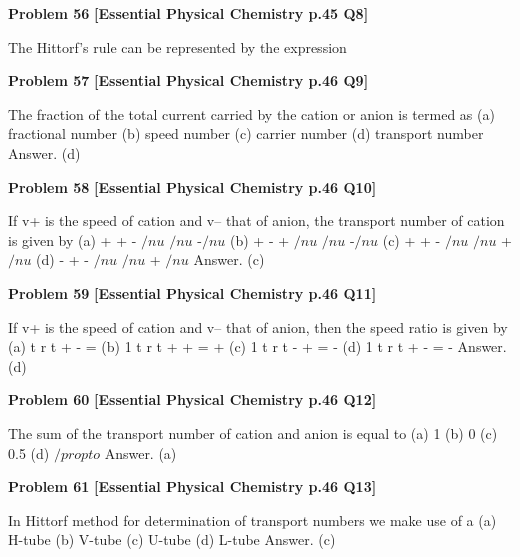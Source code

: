 \begin{problembox}
\textbf{Problem 56} \hfill \textbf{[Essential Physical Chemistry p.45 Q8]}
\label{q:ext-essential_all_questions-56}

The Hittorf's rule can be represented by the expression
\end{problembox}

\begin{problembox}
\textbf{Problem 57} \hfill \textbf{[Essential Physical Chemistry p.46 Q9]}
\label{q:ext-essential_all_questions-57}

The fraction of the total current carried by the cation or anion is termed as
(a)
fractional number
(b)
speed number
(c)
carrier number
(d)
transport number
Answer. (d)
\end{problembox}

\begin{problembox}
\textbf{Problem 58} \hfill \textbf{[Essential Physical Chemistry p.46 Q10]}
\label{q:ext-essential_all_questions-58}

If v+ is the speed of cation and v-- that of anion, the transport number of cation is given by
(a)
+
+
-
$/nu$
$/nu$ -$/nu$
(b)
+
-
+
$/nu$
$/nu$ -$/nu$
(c)
+
+
-
$/nu$
$/nu$ + $/nu$
(d)
-
+
-
$/nu$
$/nu$ + $/nu$
Answer. (c)
\end{problembox}

\begin{problembox}
\textbf{Problem 59} \hfill \textbf{[Essential Physical Chemistry p.46 Q11]}
\label{q:ext-essential_all_questions-59}

If v+ is the speed of cation and v-- that of anion, then the speed ratio is given by
(a)
t
r
t
+
-
=
(b)
1
t
r
t
+
+
=
+
(c)
1
t
r
t
-
+
=
-
(d)
1
t
r
t
+
-
=
-
Answer. (d)
\end{problembox}

\begin{problembox}
\textbf{Problem 60} \hfill \textbf{[Essential Physical Chemistry p.46 Q12]}
\label{q:ext-essential_all_questions-60}

The sum of the transport number of cation and anion is equal to
(a)
1
(b)
0
(c)
0.5
(d)
$/propto$
Answer. (a)
\end{problembox}

\begin{problembox}
\textbf{Problem 61} \hfill \textbf{[Essential Physical Chemistry p.46 Q13]}
\label{q:ext-essential_all_questions-61}

In Hittorf method for determination of transport numbers we make use of a
(a)
H-tube
(b)
V-tube
(c)
U-tube
(d)
L-tube
Answer. (c)
\end{problembox}

